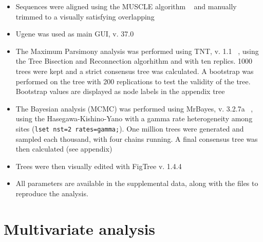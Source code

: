 \begin{itemize}
\item Sequences were aligned using the MUSCLE algorithm ~\citep{edgar2004} and manually trimmed to a visually satisfying overlapping

\item Ugene was used as main GUI, v. 37.0 ~\citep{okonechnikov2012}

\item The Maximum Parsimony analysis was performed using TNT, v. 1.1 ~\citep{tnt}, using the Tree Bisection and Reconnection algorhithm and with ten replics. 1000 trees were kept and a strict consensus tree was calculated. A bootstrap was performed on the tree with 200 replications to test the validity of the tree. Bootstrap values are displayed as node labels in the appendix tree

\item The Bayesian analysis (MCMC) was performed using MrBayes, v. 3.2.7a ~\citep{huelsenbeck2001}, using the Hasegawa-Kishino-Yano with a gamma rate heterogeneity among sites (\texttt{lset nst=2 rates=gamma;}). One million trees were generated and sampled each thousand, with four chains running. A final consensus tree was then calculated (see appendix)

\item Trees were then visually edited with FigTree v. 1.4.4

\item All parameters are available in the supplemental data, along with the files to reproduce the analysis.

\end{itemize}

\chapter{Multivariate analysis}
\label{multivariateanalysis}

